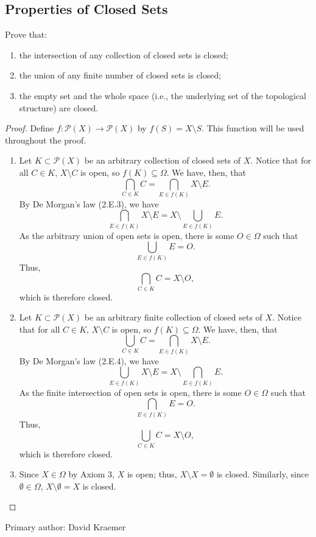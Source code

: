 \subsection{Properties of Closed Sets}

\begin{majorEx}
    Prove that:
    \begin{enumerate}
        \item the intersection of any collection of closed sets is closed;
        \item the union of any finite number of closed sets is closed;
        \item the empty set and the whole space (i.e., the underlying set of the
            topological structure) are closed.
    \end{enumerate}
\end{majorEx}

\begin{proof}
    Define $f : \mathcal{P}(X) \to \mathcal{P}(X)$ by $f(S) = X \setminus S$.
    This function will be used throughout the proof.
    \begin{enumerate}
        \item Let $K \subset \mathcal{P}(X)$ be an arbitrary collection of
            closed sets of $X$. Notice that for all $C \in K$, $X \setminus C$
            is open, so $f(K) \subseteq \Omega$. We have, then, that
            \[
                \bigcap_{C \in K} C = \bigcap_{E \in f(K)} X \setminus E.
            \]
            By De Morgan's law (2.E.3), we have
            \[
                \bigcap_{E \in f(K)} X \setminus E = X \setminus
                \bigcup_{E \in f(K)} E.
            \]
            As the arbitrary union of open sets is open, there is some $O \in
            \Omega$ such that
            \[
                \bigcup_{E \in f(K)} E = O.
            \]
            Thus,
            \[
                \bigcap_{C \in K} C = X \setminus O,
            \]
            which is therefore closed.
        \item Let $K \subset \mathcal{P}(X)$ be an arbitrary finite collection
            of closed sets of $X$. Notice that for all $C \in K$, $X \setminus
            C$ is open, so $f(K) \subseteq \Omega$. We have, then, that
            \[
                \bigcup_{C \in K} C = \bigcap_{E \in f(K)} X \setminus E.
            \]
            By De Morgan's law (2.E.4), we have
            \[
                \bigcup_{E \in f(K)} X \setminus E = X \setminus \bigcap_{E \in
                f(K)} E.
            \]
            As the finite intersection of open sets is open, there is some $O
            \in \Omega$ such that
            \[
                \bigcap_{E \in f(K)} E = O.
            \]
            Thus,
            \[
                \bigcup_{C \in K} C = X \setminus O,
            \]
            which is therefore closed.
        \item Since $X \in \Omega$ by Axiom 3, $X$ is open; thus, $X \setminus X
            = \emptyset$ is closed. Similarly, since $\emptyset \in \Omega$, $X
            \setminus \emptyset = X$ is closed.
    \end{enumerate}
\end{proof}

Primary author: David Kraemer
